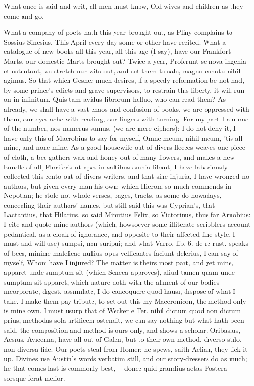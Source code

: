 {What once is said and writ, all men must know,
Old wives and children as they come and go.

What a company of poets hath this year brought out, as Pliny complains
to Sossius Sinesius. This April every day some or other have
recited. What a catalogue of new books all this year, all this age (I
say), have our Frankfort Marts, our domestic Marts brought out? Twice a
year,  Proferunt se nova ingenia et ostentant, we stretch our wits
out, and set them to sale, magno conatu nihil agimus. So that which
Gesner much desires, if a speedy reformation be not had, by some
prince's edicts and grave supervisors, to restrain this liberty, it
will run on in infinitum. Quis tam avidus librorum helluo, who can read
them? As already, we shall have a vast chaos and confusion of books, we
are oppressed with them, our eyes ache with reading, our
fingers with turning. For my part I am one of the number, nos numerus
sumus, (we are mere ciphers): I do not deny it, I have only this of
Macrobius to say for myself, Omne meum, nihil meum, 'tis all mine, and
none mine. As a good housewife out of divers fleeces weaves one piece
of cloth, a bee gathers wax and honey out of many flowers, and makes a
new bundle of all, Floriferis ut apes in saltibus omnia libant, I have
laboriously collected this cento out of divers writers, and that
sine injuria, I have wronged no authors, but given every man his own;
which Hierom so much commends in Nepotian; he stole not whole
verses, pages, tracts, as some do nowadays, concealing their authors'
names, but still said this was Cyprian's, that Lactantius, that
Hilarius, so said Minutius Felix, so Victorinus, thus far Arnobius: I
cite and quote mine authors (which, howsoever some illiterate
scribblers account pedantical, as a cloak of ignorance, and opposite to
their affected fine style, I must and will use) sumpsi, non suripui;
and what Varro, lib. 6. de re rust. speaks of bees, minime maleficae
nullius opus vellicantes faciunt delerius, I can say of myself, Whom
have I injured? The matter is theirs most part, and yet mine, apparet
unde sumptum sit (which Seneca approves), aliud tamen quam unde sumptum
sit apparet, which nature doth with the aliment of our bodies
incorporate, digest, assimilate, I do concoquere quod hausi, dispose of
what I take. I make them pay tribute, to set out this my Maceronicon,
the method only is mine own, I must usurp that of Wecker e Ter.
nihil dictum quod non dictum prius, methodus sola artificem ostendit,
we can say nothing but what hath been said, the composition and method
is ours only, and shows a scholar. Oribasius, Aesius, Avicenna, have
all out of Galen, but to their own method, diverso stilo, non diversa
fide. Our poets steal from Homer; he spews, saith Aelian, they lick it
up. Divines use Austin's words verbatim still, and our story-dressers
do as much; he that comes last is commonly best,
---donec quid grandius aetas
Postera sorsque ferat melior.---

}
